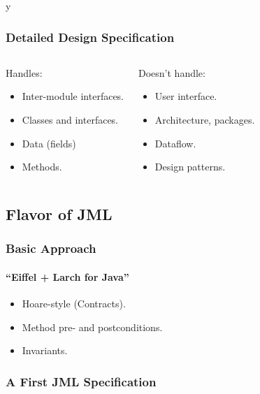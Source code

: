 \if y\MAKEHANDOUTS \documentclass[t,compress,landscape,handout]{beamer}
\begin{document}
\begin{frame}
\frametitle{Detailed Design Specification}

\begin{columns}[t]
\begin{block}{Handles:}
\begin{itemize}
\item
Inter-module interfaces.

\item
Classes and interfaces.

\item 
Data (fields)

\item
Methods.
\end{itemize}
\end{block}

\pause

\begin{block}{Doesn't handle:}
\begin{itemize}
\item
User interface.

\item 
Architecture, packages.

\item
Dataflow.

\item
Design patterns.
\end{itemize}
\end{block}
\end{columns}
\end{frame}

\subsection[Flavor]{Flavor of JML}

\begin{frame}
\frametitle{Basic Approach}
\framesubtitle{``Eiffel + Larch for Java''}
\begin{itemize}
\item
Hoare-style (Contracts).

\item
Method pre- and postconditions.

\item
Invariants.
\end{itemize}
\end{frame}

\begin{frame}[fragile]
\frametitle{A First JML Specification}

\end{frame}
\end{document}
